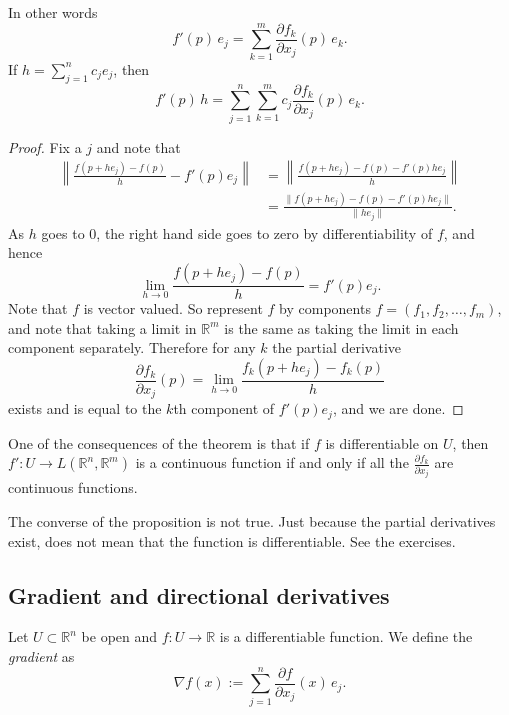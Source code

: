 \documentclass[12pt]{book}
\newcommand{\snorm}[1]{\lVert {#1} \rVert}
\newcommand{\norm}[1]{\left\lVert {#1} \right\rVert}
\newcommand{\R}{{\mathbb{R}}}
\newcommand{\myindex}[1]{#1\index{#1}}
\theoremstyle{plain}
\theoremstyle{remark}
\theoremstyle{definition}
\theoremstyle{exercise}
\theoremstyle{example}
\begin{document}
In other words
\begin{equation*}
f'(p) \, e_j =
\sum_{k=1}^m
\frac{\partial f_k}{\partial x_j}(p) \,e_k .
\end{equation*}
If $h = \sum_{j=1}^n c_j e_j$, then
\begin{equation*}
f'(p) \, h =
\sum_{j=1}^n
\sum_{k=1}^m
 c_j
\frac{\partial f_k}{\partial x_j}(p) \,e_k .
\end{equation*}

\begin{proof}
Fix a $j$ and note that
\begin{equation*}
\begin{split}
\norm{\frac{f(p+h e_j)-f(p)}{h} - f'(p) e_j} & = 
\norm{\frac{f(p+h e_j)-f(p) - f'(p) h e_j}{h}} \\
& =
\frac{\snorm{f(p+h e_j)-f(p) - f'(p) h e_j}}{\snorm{h e_j}} .
\end{split}
\end{equation*}
As $h$ goes to 0, the right hand side goes to zero by
differentiability of $f$, and hence
\begin{equation*}
\lim_{h \to 0}
\frac{f(p+h e_j)-f(p)}{h} = f'(p) e_j  .
\end{equation*}
Note that $f$ is vector valued.  So represent $f$ by components
$f = (f_1,f_2,\ldots,f_m)$, and note that taking a limit in $\R^m$
is the same as taking the limit in each component separately.  Therefore
for any $k$
the partial derivative
\begin{equation*}
\frac{\partial f_k}{\partial x_j} (p)
=
\lim_{h \to 0}
\frac{f_k(p+h e_j)-f_k(p)}{h}
\end{equation*}
exists and 
is equal to the $k$th component of $f'(p) e_j$, and we are done.
\end{proof}

One of the consequences of the theorem is that if $f$
is differentiable on $U$, then $f' \colon U \to
L(\R^n,\R^m)$ is a continuous function if and only if
all the $\frac{\partial f_k}{\partial x_j}$ are continuous functions.

The converse of the proposition is not true.  Just because the partial
derivatives exist, does not mean that the function is differentiable.  See
the exercises.

\subsection{Gradient and directional derivatives}

Let $U \subset \R^n$ be open and $f \colon U \to \R$ is a differentiable
function.  We define
the \emph{\myindex{gradient}} as
\begin{equation*}
\nabla f (x) := \sum_{j=1}^n \frac{\partial f}{\partial x_j} (x)\, e_j .
\end{equation*}
\end{document}
